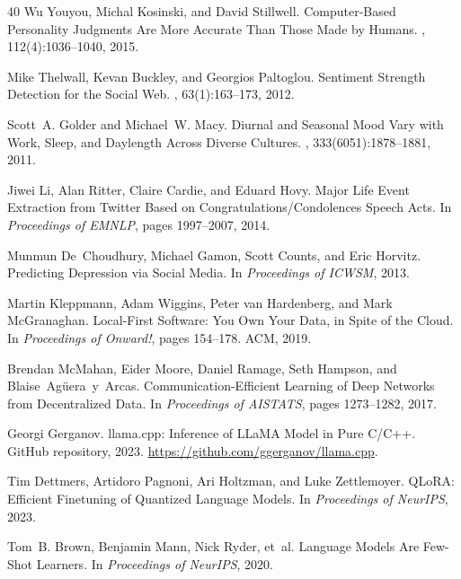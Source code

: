 \documentclass[manuscript,review]{acmart}
\begin{document}
\begin{thebibliography}{40}
Wu Youyou, Michal Kosinski, and David Stillwell.
\newblock Computer-Based Personality Judgments Are More Accurate Than Those Made by Humans.
, 112(4):1036--1040, 2015.

Mike Thelwall, Kevan Buckley, and Georgios Paltoglou.
\newblock Sentiment Strength Detection for the Social Web.
, 63(1):163--173, 2012.

Scott~A. Golder and Michael~W. Macy.
\newblock Diurnal and Seasonal Mood Vary with Work, Sleep, and Daylength Across Diverse Cultures.
, 333(6051):1878--1881, 2011.

Jiwei Li, Alan Ritter, Claire Cardie, and Eduard Hovy.
\newblock Major Life Event Extraction from Twitter Based on Congratulations/Condolences Speech Acts.
\newblock In {\em Proceedings of EMNLP}, pages 1997--2007, 2014.

Munmun De~Choudhury, Michael Gamon, Scott Counts, and Eric Horvitz.
\newblock Predicting Depression via Social Media.
\newblock In {\em Proceedings of ICWSM}, 2013.

Martin Kleppmann, Adam Wiggins, Peter van Hardenberg, and Mark McGranaghan.
\newblock Local-First Software: You Own Your Data, in Spite of the Cloud.
\newblock In {\em Proceedings of Onward!}, pages 154--178. ACM, 2019.

Brendan McMahan, Eider Moore, Daniel Ramage, Seth Hampson, and Blaise~Ag{\"u}era~y~Arcas.
\newblock Communication-Efficient Learning of Deep Networks from Decentralized Data.
\newblock In {\em Proceedings of AISTATS}, pages 1273--1282, 2017.

Georgi Gerganov.
\newblock llama.cpp: Inference of LLaMA Model in Pure C/C++.
\newblock GitHub repository, 2023.
\newblock \url{https://github.com/ggerganov/llama.cpp}.

Tim Dettmers, Artidoro Pagnoni, Ari Holtzman, and Luke Zettlemoyer.
\newblock QLoRA: Efficient Finetuning of Quantized Language Models.
\newblock In {\em Proceedings of NeurIPS}, 2023.

Tom~B. Brown, Benjamin Mann, Nick Ryder, et~al.
\newblock Language Models Are Few-Shot Learners.
\newblock In {\em Proceedings of NeurIPS}, 2020.


\end{thebibliography}
\end{document}
